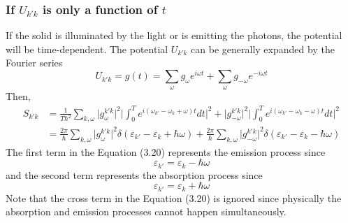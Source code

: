 \subsubsection{If $U_{k'k}$ is only a function of $t$}
If the solid is illuminated by the light or is emitting the photons, the potential will be time-dependent. The potential $U_{k'k}$ can be generally expanded by the Fourier series \begin{equation}
    U_{k'k} = g(t) = \sum_{\omega}{g_{\omega}e^{i\omega t}} + \sum_{\omega}{g_{-\omega}e^{-i\omega t}}
\end{equation} Then, \begin{align}
    S_{k'k}& = \frac{1}{T\hbar^{2}}\sum_{k,\omega}{\big|g_{\omega}^{k'k}\big|^{2}\big|\int_{0}^{T}e^{i(\omega_{k'}-\omega_{k}+\omega)t}dt\big|^{2}+\big|g_{-\omega}^{k'k}\big|^{2}\big|\int_{0}^{T}e^{i(\omega_{k'}-\omega_{k}-\omega)t}dt\big|^{2}}\nonumber\\
    & = \frac{2\pi}{\hbar}\sum_{k,\omega}{\big|g_{\omega}^{k'k}\big|^{2}\delta(\varepsilon_{k'}-\varepsilon_{k}+\hbar\omega)}+\frac{2\pi}{\hbar}\sum_{k,\omega}{\big|g_{-\omega}^{k'k}\big|^{2}\delta(\varepsilon_{k'}-\varepsilon_{k}-\hbar\omega)}
\end{align} The first term in the Equation (3.20) represents the emission process since \begin{equation}
    \varepsilon_{k'} = \varepsilon_{k} - \hbar\omega \nonumber
\end{equation} and the second term represents the absorption process since \begin{equation}
    \varepsilon_{k'} = \varepsilon_{k} + \hbar\omega \nonumber
\end{equation} Note that the cross term in the Equation (3.20) is ignored since physically the absorption and emission processes cannot happen simultaneously.
